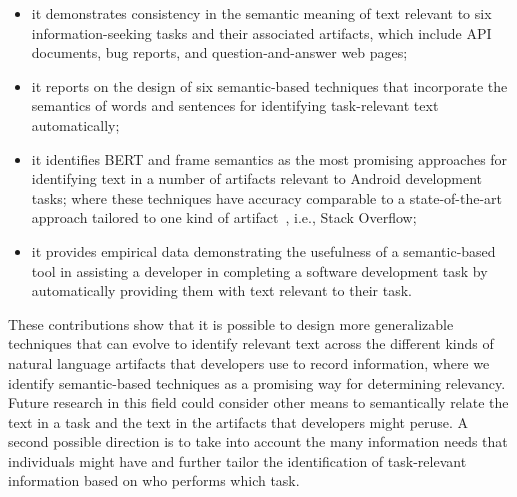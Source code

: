 \begin{itemize}
    \item it demonstrates consistency in the semantic meaning of text relevant to six information-seeking tasks and their associated artifacts, which include API documents, bug reports, and question-and-answer web pages;
    \item it reports on the design of six semantic-based techniques that incorporate the semantics of words and sentences for identifying task-relevant text automatically;
    \item it identifies BERT and frame semantics as the most promising approaches for identifying text in 
    a number of artifacts relevant to Android development tasks; where these techniques have  accuracy comparable to a state-of-the-art approach     tailored to one kind of artifact~\cite{Xu2017}, i.e., Stack Overflow;
    \item it provides empirical data demonstrating the usefulness of a semantic-based tool in assisting a 
    developer in completing a software development task by automatically providing them with text relevant 
    to their task.
    
\end{itemize}



These contributions show that it is possible to design 
more generalizable techniques
that can evolve to 
identify relevant text across the different kinds of natural language artifacts that 
developers use to record information, where we identify semantic-based techniques as a promising way for determining relevancy. Future research in this field could consider other means to semantically relate the text in a task and the text in the artifacts that developers might peruse.
A second possible direction is to take into account the many information needs that individuals might have and further tailor the identification of task-relevant information based on who performs which task.



